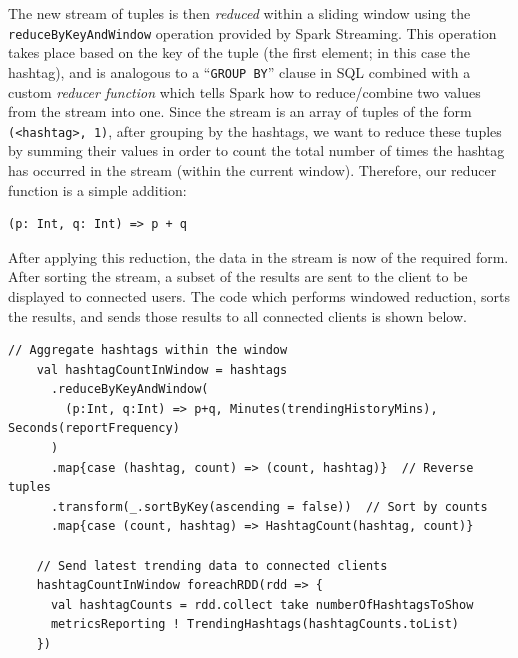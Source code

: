 \documentclass{l4proj}
\newcommand{\code}[1]{\texttt{#1}}
\begin{document}
The new stream of tuples is then \textit{reduced} within a sliding window using the \code{reduceByKeyAndWindow} operation provided by Spark Streaming. This operation takes place based on the key of the tuple (the first element; in this case the hashtag), and is analogous to a ``\code{GROUP BY}'' clause in SQL combined with a custom \textit{reducer function} which tells Spark how to reduce/combine two values from the stream into one. Since the stream is an array of tuples of the form \code{(<hashtag>, 1)}, after grouping by the hashtags, we want to reduce these tuples by summing their values in order to count the total number of times the hashtag has occurred in the stream (within the current window). Therefore, our reducer function is a simple addition:

\begin{lstlisting}
(p: Int, q: Int) => p + q
\end{lstlisting}

After applying this reduction, the data in the stream is now of the required form. After sorting the stream, a subset of the results are sent to the client to be displayed to connected users. The code which performs windowed reduction, sorts the results, and sends those results to all connected clients is shown below.

\begin{lstlisting}[caption=Counting the hashtags used within a temporal window.]
    // Aggregate hashtags within the window
    val hashtagCountInWindow = hashtags
      .reduceByKeyAndWindow(
        (p:Int, q:Int) => p+q, Minutes(trendingHistoryMins), Seconds(reportFrequency)
      )
      .map{case (hashtag, count) => (count, hashtag)}  // Reverse tuples
      .transform(_.sortByKey(ascending = false))  // Sort by counts
      .map{case (count, hashtag) => HashtagCount(hashtag, count)}

    // Send latest trending data to connected clients
    hashtagCountInWindow foreachRDD(rdd => {
      val hashtagCounts = rdd.collect take numberOfHashtagsToShow
      metricsReporting ! TrendingHashtags(hashtagCounts.toList)
    })

\end{lstlisting}
\end{document}
